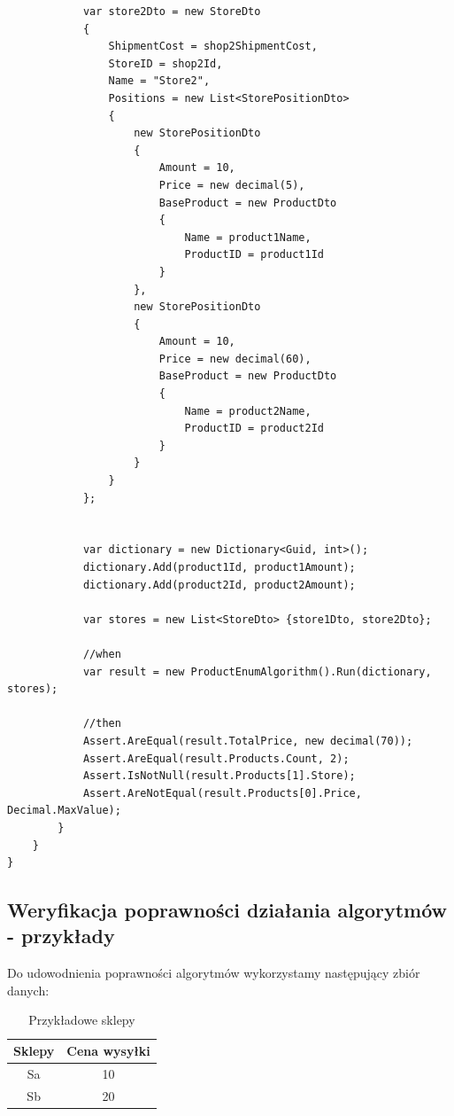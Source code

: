 \documentclass[a4paper]{article}
\begin{document}
\begin{lstlisting}
            var store2Dto = new StoreDto
            {
                ShipmentCost = shop2ShipmentCost,
                StoreID = shop2Id,
                Name = "Store2",
                Positions = new List<StorePositionDto>
                {
                    new StorePositionDto
                    {
                        Amount = 10,
                        Price = new decimal(5),
                        BaseProduct = new ProductDto
                        {
                            Name = product1Name,
                            ProductID = product1Id
                        }
                    },
                    new StorePositionDto
                    {
                        Amount = 10,
                        Price = new decimal(60),
                        BaseProduct = new ProductDto
                        {
                            Name = product2Name,
                            ProductID = product2Id
                        }
                    }
                }
            };


            var dictionary = new Dictionary<Guid, int>();
            dictionary.Add(product1Id, product1Amount);
            dictionary.Add(product2Id, product2Amount);

            var stores = new List<StoreDto> {store1Dto, store2Dto};

            //when
            var result = new ProductEnumAlgorithm().Run(dictionary, stores);

            //then
            Assert.AreEqual(result.TotalPrice, new decimal(70));
            Assert.AreEqual(result.Products.Count, 2);
            Assert.IsNotNull(result.Products[1].Store);
            Assert.AreNotEqual(result.Products[0].Price, Decimal.MaxValue);
        }
    }
}
\end{lstlisting}

\subsection{Weryfikacja poprawności działania algorytmów - przykłady}
Do udowodnienia poprawności algorytmów wykorzystamy następujący zbiór danych:

\begin{table}[H]
\renewcommand{\arraystretch}{1.3}
\centering
\caption{Przykładowe sklepy}
\begin{tabular}{|c|c|}
\hline
Sklepy & Cena wysyłki \\ \hline
Sa     & 10           \\ \hline
Sb     & 20           \\ \hline
\end{tabular}
\end{table}
\end{document}
